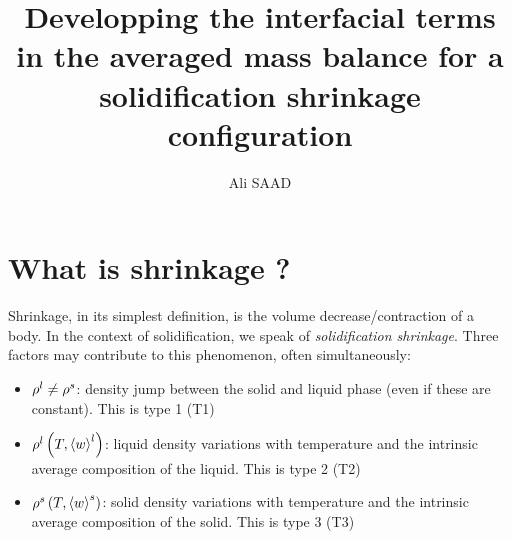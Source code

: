 \documentclass[11pt,a4paper]{article}
\title{Developping the interfacial terms in the averaged mass balance for a solidification shrinkage configuration}
\author{Ali SAAD}
\begin{document}
\maketitle

\section{What is shrinkage ?}
Shrinkage, in its simplest definition, is the volume decrease/contraction of a body. In the context of solidification, we
speak of \emph{solidification shrinkage}. Three factors may contribute to this phenomenon, often simultaneously:
\begin{itemize}
\item $\rho^l \neq \rho^s$: density jump between the solid and liquid phase (even if these are constant). This is type 1 (T1)
\item $\rho^l \left( T,\left\langle w \right\rangle^l \right) $: liquid density variations with temperature and the intrinsic average composition of the liquid. This is type 2 (T2)
\item $\rho^s \left( T,\left\langle w \right\rangle^s \right) $: solid density variations with temperature and the intrinsic average composition of the solid. This is type 3 (T3)
\end{itemize}  
\end{document}
